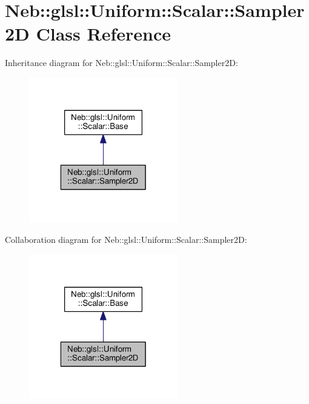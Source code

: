 \hypertarget{classNeb_1_1glsl_1_1Uniform_1_1Scalar_1_1Sampler2D}{\section{Neb\-:\-:glsl\-:\-:Uniform\-:\-:Scalar\-:\-:Sampler2\-D Class Reference}
\label{classNeb_1_1glsl_1_1Uniform_1_1Scalar_1_1Sampler2D}
}


Inheritance diagram for Neb\-:\-:glsl\-:\-:Uniform\-:\-:Scalar\-:\-:Sampler2\-D\-:
\nopagebreak
\begin{figure}[H]
\begin{center}
\leavevmode
\includegraphics[width=184pt]{classNeb_1_1glsl_1_1Uniform_1_1Scalar_1_1Sampler2D__inherit__graph}
\end{center}
\end{figure}


Collaboration diagram for Neb\-:\-:glsl\-:\-:Uniform\-:\-:Scalar\-:\-:Sampler2\-D\-:
\nopagebreak
\begin{figure}[H]
\begin{center}
\leavevmode
\includegraphics[width=184pt]{classNeb_1_1glsl_1_1Uniform_1_1Scalar_1_1Sampler2D__coll__graph}
\end{center}
\end{figure}
